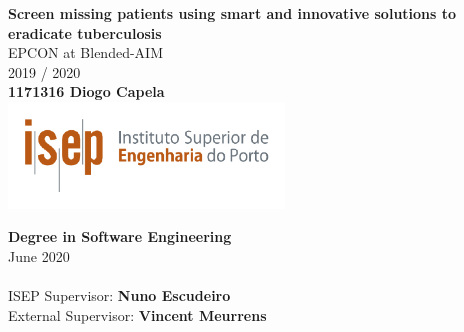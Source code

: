 

\thispagestyle{empty}

	\begin{center}
		

		\vspace*{2.5cm}
		\Large{\textbf{Screen missing patients using smart and innovative solutions to eradicate tuberculosis}}\\
			
		\vspace{0.7cm}
		\normalsize EPCON at Blended-AIM \\
	
		\large
		\vspace*{0.5cm} 2019 / 2020\\
		\vspace*{1.5cm}
		\normalsize \textbf{1171316 Diogo Capela}\\

	
		\vspace*{2.5cm}
	\includegraphics[width=0.55\textwidth]{images/isep.pdf}
	    \vspace*{2.5cm}

		\Large{\textbf{Degree in Software Engineering}}\\
			    \vspace*{1.5cm}
			\normalsize June 2020 \\ \\
				    \vspace*{1.5cm}
			\normalsize ISEP Supervisor: \textbf{Nuno Escudeiro}\\
			\normalsize External Supervisor:  \textbf{Vincent Meurrens}\\

	
\end{center}

